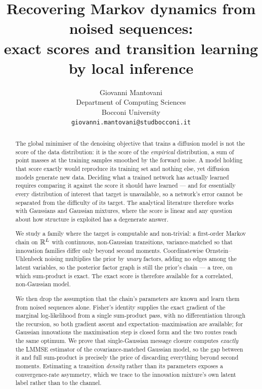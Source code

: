 \documentclass{article}
\title{Recovering Markov dynamics from noised sequences:\\
exact scores and transition learning by local inference}
\author{%
  Giovanni Mantovani \\
  Department of Computing Sciences \\
  Bocconi University \\
  \texttt{giovanni.mantovani@studbocconi.it}
}
\begin{document}
\maketitle

\begin{center}
\end{center}

\begin{abstract}
The global minimiser of the denoising objective that trains a diffusion model is not the score of
the data distribution: it is the score of the \emph{empirical} distribution, a sum of point masses
at the training samples smoothed by the forward noise. A model holding that score exactly would
reproduce its training set and nothing else, yet diffusion models generate new data. Deciding what
a trained network has actually learned requires comparing it against the score it should have
learned --- and for essentially every distribution of interest that target is unavailable, so a
network's error cannot be separated from the difficulty of its target. The analytical literature
therefore works with Gaussians and Gaussian mixtures, where the score is linear and any question
about how structure is exploited has a degenerate answer.

We study a family where the target is computable and non-trivial: a first-order Markov chain on
$\mathbb{R}^{L}$ with continuous, non-Gaussian transitions, variance-matched so that innovation
families differ only beyond second moments. Coordinatewise Ornstein--Uhlenbeck noising multiplies
the prior by \emph{unary} factors, adding no edges among the latent variables, so the posterior
factor graph is still the prior's chain --- a tree, on which sum-product is exact. The exact score
is therefore available for a correlated, non-Gaussian model.

We then drop the assumption that the chain's parameters are known and learn them from noised
sequences alone. Fisher's identity supplies the exact gradient of the marginal log-likelihood from
a single sum-product pass, with no differentiation through the recursion, so both gradient ascent
and expectation--maximisation are available; for Gaussian innovations the maximisation step is
closed form and the two routes reach the same optimum. We prove that single-Gaussian message
closure computes \emph{exactly} the LMMSE estimator of the covariance-matched Gaussian model, so
the gap between it and full sum-product is precisely the price of discarding everything beyond
second moments. Estimating a transition \emph{density} rather than its parameters exposes a
convergence-rate asymmetry, which we trace to the innovation mixture's own latent label rather
than to the channel.


\end{abstract}
\end{document}
